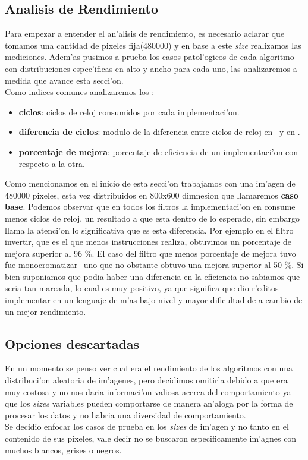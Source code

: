\subsection{Analisis de Rendimiento}
Para empezar a entender el an'alisis de rendimiento, es necesario aclarar que tomamos una cantidad
de pixeles fija(480000) y en base a este \textit{size} realizamos las mediciones.
Adem'as pusimos a prueba los casos patol'ogicos de cada algoritmo con distribuciones espec'ificas en
alto y ancho para cada uno, las analizaremos a medida que avance esta secci'on.\\
Como indices comunes analizaremos los :\\
\begin{itemize}
 \item{} \textbf{ciclos}: ciclos de reloj consumidos por cada implementaci'on.
 \item{} \textbf{diferencia de ciclos}: modulo de la diferencia entre ciclos de reloj en \C \ y en \ass.
 \item{} \textbf{porcentaje de mejora}: porcentaje de eficiencia de un implementaci'on con respecto a la otra.
\end{itemize}
Como mencionamos en el inicio de esta secci'on trabajamos con una im'agen de 480000 pixeles, esta vez
distribuidos en 800x600 dimnesion que llamaremos \textbf{caso base}. Podemos observar que en todos los filtros 
la implementaci'on en \ass consume
menos ciclos de reloj, un resultado a que esta dentro de lo esperado, sin embargo llama la atenci'on
lo significativa que es esta diferencia. Por ejemplo en el filtro invertir, que es el que menos instrucciones
realiza, obtuvimos un porcentaje de mejora superior al 96 $\%$. El caso del filtro que menos porcentaje
de mejora tuvo fue monocromatizar_uno que no obstante obtuvo una mejora superior al 50 $\%$. Si bien
suponiamos que podia haber una diferencia en la eficiencia no sabiamos que seria tan marcada, lo cual es muy 
positivo, ya que significa que dio r'editos implementar en un lenguaje de m'as bajo nivel y mayor dificultad
de a cambio de un mejor rendimiento.\\
  
 

\subsection{Opciones descartadas}
En un momento se penso ver cual era el rendimiento de los algoritmos con una distribuci'on 
aleatoria de im'agenes, pero decidimos omitirla debido a que era muy costosa y no nos 
daria informaci'on valiosa acerca del comportamiento ya que los \textit{sizes} variables pueden comportarse 
de manera an'aloga por la forma de procesar los datos y no habria una diversidad de comportamiento.\\
Se decidio enfocar los casos de prueba en los \textit{sizes} de im'agen y no tanto en el contenido de 
sus pixeles, vale decir no se buscaron especificamente im'agnes con muchos blancos, grises o negros.   


